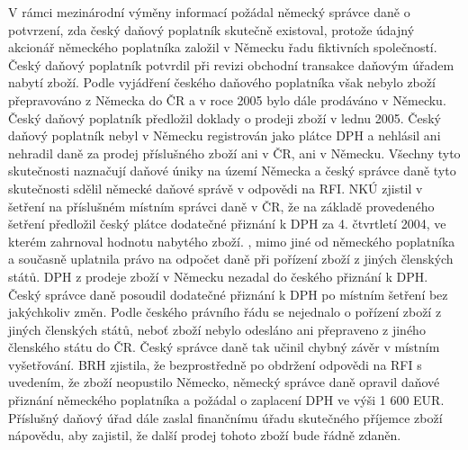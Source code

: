 \documentclass[10pt]{article}
\begin{document}
V rámci mezinárodní výměny informací požádal německý správce daně o potvrzení, zda český daňový poplatník skutečně existoval, protože údajný akcionář německého poplatníka založil v Německu řadu fiktivních společností.
Český daňový poplatník potvrdil při revizi obchodní transakce daňovým úřadem nabytí zboží.
Podle vyjádření českého daňového poplatníka však nebylo zboží přepravováno z Německa do ČR a v roce 2005 bylo dále prodáváno v Německu.
Český daňový poplatník předložil doklady o prodeji zboží v lednu 2005.
Český daňový poplatník nebyl v Německu registrován jako plátce DPH a nehlásil ani nehradil daně za prodej příslušného zboží ani v ČR, ani v Německu.
Všechny tyto skutečnosti naznačují daňové úniky na území Německa a český správce daně tyto skutečnosti sdělil německé daňové správě v odpovědi na RFI.
NKÚ zjistil v šetření na příslušném místním správci daně v ČR, že na základě provedeného šetření předložil český plátce dodatečné přiznání k DPH za 4. čtvrtletí 2004, ve kterém zahrnoval hodnotu nabytého zboží. , mimo jiné od německého poplatníka a současně uplatnila právo na odpočet daně při pořízení zboží z jiných členských států.
DPH z prodeje zboží v Německu nezadal do českého přiznání k DPH.
Český správce daně posoudil dodatečné přiznání k DPH po místním šetření bez jakýchkoliv změn.
Podle českého právního řádu se nejednalo o pořízení zboží z jiných členských států, neboť zboží nebylo odesláno ani přepraveno z jiného členského státu do ČR.
Český správce daně tak učinil chybný závěr v místním vyšetřování.
BRH zjistila, že bezprostředně po obdržení odpovědi na RFI s uvedením, že zboží neopustilo Německo, německý správce daně opravil daňové přiznání německého poplatníka a požádal o zaplacení DPH ve výši 1 600 EUR.
Příslušný daňový úřad dále zaslal finančnímu úřadu skutečného příjemce zboží nápovědu, aby zajistil, že další prodej tohoto zboží bude řádně zdaněn.
\end{document}
